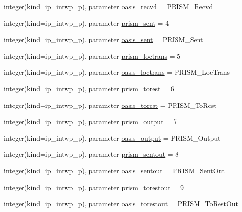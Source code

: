 \begin{DoxyCompactItemize}
\item 
integer(kind=ip\+\_\+intwp\+\_\+p), parameter \hyperlink{namespacemod__oasis__parameters_a50fc92036d81ca0ea23918e1feddfe75}{oasis\+\_\+recvd} = P\+R\+I\+S\+M\+\_\+\+Recvd
\item 
integer(kind=ip\+\_\+intwp\+\_\+p), parameter \hyperlink{namespacemod__oasis__parameters_a403c181a893e178ee0ad6ec6f8d26c9c}{prism\+\_\+sent} = 4
\item 
integer(kind=ip\+\_\+intwp\+\_\+p), parameter \hyperlink{namespacemod__oasis__parameters_af739945ec2da833423cdc6e220e1c847}{oasis\+\_\+sent} = P\+R\+I\+S\+M\+\_\+\+Sent
\item 
integer(kind=ip\+\_\+intwp\+\_\+p), parameter \hyperlink{namespacemod__oasis__parameters_af9dc530c2cf2f0e5b5bb04fecb8373dd}{prism\+\_\+loctrans} = 5
\item 
integer(kind=ip\+\_\+intwp\+\_\+p), parameter \hyperlink{namespacemod__oasis__parameters_a8b206cc178182e3526d400ea7a6587b5}{oasis\+\_\+loctrans} = P\+R\+I\+S\+M\+\_\+\+Loc\+Trans
\item 
integer(kind=ip\+\_\+intwp\+\_\+p), parameter \hyperlink{namespacemod__oasis__parameters_a8d037fafc163f46260a8704f92a885a1}{prism\+\_\+torest} = 6
\item 
integer(kind=ip\+\_\+intwp\+\_\+p), parameter \hyperlink{namespacemod__oasis__parameters_a875abcc1cc679cb72f20d42d3dbfac97}{oasis\+\_\+torest} = P\+R\+I\+S\+M\+\_\+\+To\+Rest
\item 
integer(kind=ip\+\_\+intwp\+\_\+p), parameter \hyperlink{namespacemod__oasis__parameters_adc510873316710fd71696fabcc34f336}{prism\+\_\+output} = 7
\item 
integer(kind=ip\+\_\+intwp\+\_\+p), parameter \hyperlink{namespacemod__oasis__parameters_a7f9f81f3b1f2c8b09a460aeca27ea859}{oasis\+\_\+output} = P\+R\+I\+S\+M\+\_\+\+Output
\item 
integer(kind=ip\+\_\+intwp\+\_\+p), parameter \hyperlink{namespacemod__oasis__parameters_a9f683811203a8cf60704b4938a8f3a11}{prism\+\_\+sentout} = 8
\item 
integer(kind=ip\+\_\+intwp\+\_\+p), parameter \hyperlink{namespacemod__oasis__parameters_a1804e9b27d8d7ace38fd4c3f99ade6dd}{oasis\+\_\+sentout} = P\+R\+I\+S\+M\+\_\+\+Sent\+Out
\item 
integer(kind=ip\+\_\+intwp\+\_\+p), parameter \hyperlink{namespacemod__oasis__parameters_a9ed7a0f0a9392248de5b4b15849843df}{prism\+\_\+torestout} = 9
\item 
integer(kind=ip\+\_\+intwp\+\_\+p), parameter \hyperlink{namespacemod__oasis__parameters_a390018877602efede436bd0721add299}{oasis\+\_\+torestout} = P\+R\+I\+S\+M\+\_\+\+To\+Rest\+Out

\end{DoxyCompactItemize}
